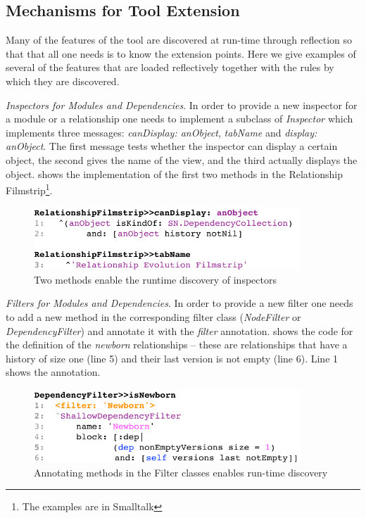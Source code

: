 \documentclass[preprint,12pt]{elsarticle}
\newcommand{\cd}[1]{{\em{#1}}}
\begin{document}
\subsection {Mechanisms for Tool Extension}
\label{sec:extensible}
Many of the features of the tool are discovered at run-time through {reflection} so that that all one needs is to know the extension points. Here we give examples of several of the features that are loaded {reflectively} together with the rules by which they are discovered.

\begin{description}
\item {\em Inspectors for Modules and Dependencies}. In order to provide a new inspector for a module or a relationship one needs to implement a subclass of {\em Inspector} which implements three messages: \cd{canDisplay: anObject}, \cd{tabName} and \cd{display: anObject}. The first message tests whether the inspector can display a certain object, the second gives the name of the view, and the third actually displays the object.  shows the implementation of the first two methods in the Relationship Filmstrip\footnote{The examples are in Smalltalk}.

\begin{figure}[h]
\begin{center}
\includegraphics[width=10cm]{images/filmstrip-sample}
\caption{Two methods enable the runtime discovery of inspectors}
\end{center}
\end{figure}

\item {\em Filters for Modules and Dependencies}. In order to provide a new filter one needs to add a new method in the corresponding filter class (\cd{NodeFilter} or \cd{DependencyFilter}) and annotate it with the \cd{filter} annotation.  shows the code for the definition of the {\em newborn} relationships -- these are relationships that have a history of size one (line 5) and their last version is not empty (line 6). Line 1 shows the annotation.

\begin{figure}[h]
\begin{center}
\includegraphics[width=10cm]{images/filter-sample}
\caption{Annotating methods in the Filter classes enables run-time discovery}
\end{center}
\end{figure}



\end{description}
\end{document}
